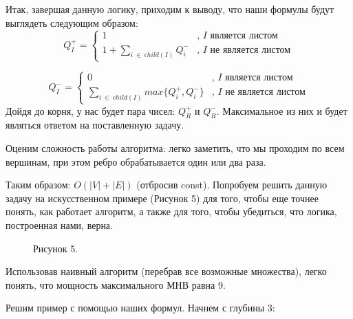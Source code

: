 \documentclass[12pt]{article}
\begin{document}
Итак, завершая данную логику, приходим к выводу, что наши формулы будут выглядеть следующим образом:
\begin{equation*}
  Q_{I}^+ =  
   \begin{cases}
     1 &\text{, $I$ является листом}\\
     1+ \sum_{i \ \in \ child(I)} Q_{i}^- &\text{, $I$ не является листом}
   \end{cases}
  \end{equation*}

  \begin{equation*}
      Q_{I}^- =  
       \begin{cases}
         0 &\text{, $I$ является листом}\\
         \sum_{i \ \in \ child(I)} max\{Q_{i}^+, Q_{i}^-\} &\text{, $I$ не является листом}
       \end{cases}
      \end{equation*}
Дойдя до корня, у нас будет пара чисел: $Q_{R}^+$ и $Q_{R}^-$. Максимальное из них и будет являться ответом на поставленную задачу.

Оценим сложность работы алгоритма: легко заметить, что мы проходим по всем вершинам, при этом ребро обрабатывается один или два раза. 

Таким образом: $O(|V| + |E|)$ (отбросив const).
\bigbreak
Попробуем решить данную задачу на искусственном примере (Рисунок 5) для того, чтобы еще точнее понять, как работает алгоритм, а также для того, чтобы убедиться, что логика, построенная нами,
верна.

\begin{figure}[h]
  \caption{Рисунок 5.}
  \label{ris:image}
  \end{figure}

Использовав наивный алгоритм (перебрав все возможные множества), легко понять, что мощность максимального МНВ равна 9. 

Решим пример с помощью наших формул. Начнем с глубины 3:
\end{document}
